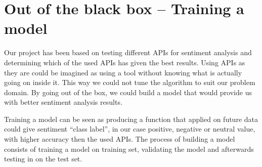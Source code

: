 \section{Out of the black box – Training a model}

Our project has been based on testing different APIs for sentiment analysis and determining which of the used APIs has given the best results. Using APIs as they are could be imagined as using a tool without knowing what is actually going on inside it. This way we could not tune the algorithm to suit our problem domain. By going out of the box, we could build a model that would provide us with better sentiment analysis results. 

Training a model can be seen as producing a function that applied on future data could give sentiment “class label”, in our case positive, negative or neutral value, with higher accuracy then the used APIs. The process of building a model consists of training a model on training set, validating the model and afterwards testing in on the test set. 
